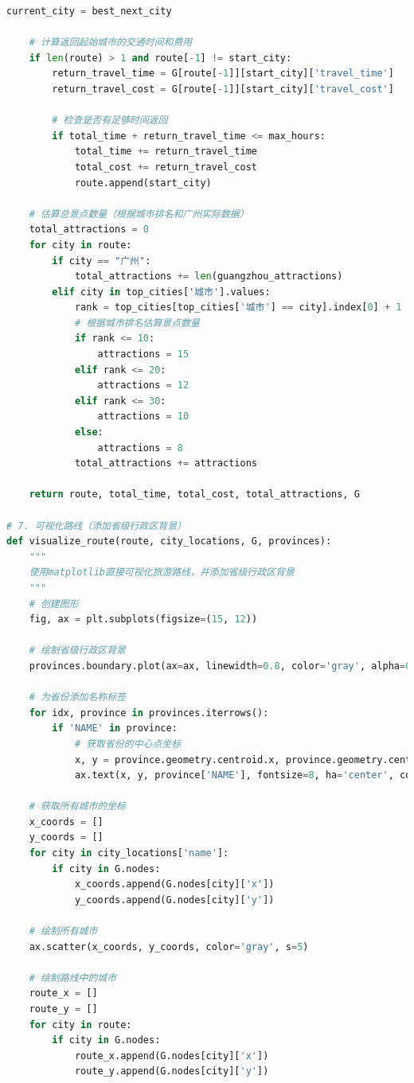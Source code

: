 \documentclass[withoutpreface,bwprint]{cumcmthesis} %
\begin{document}
\begin{appendices}
\begin{lstlisting}[language=python]
        current_city = best_next_city
    
    # 计算返回起始城市的交通时间和费用
    if len(route) > 1 and route[-1] != start_city:
        return_travel_time = G[route[-1]][start_city]['travel_time']
        return_travel_cost = G[route[-1]][start_city]['travel_cost']
        
        # 检查是否有足够时间返回
        if total_time + return_travel_time <= max_hours:
            total_time += return_travel_time
            total_cost += return_travel_cost
            route.append(start_city)
    
    # 估算总景点数量（根据城市排名和广州实际数据）
    total_attractions = 0
    for city in route:
        if city == "广州":
            total_attractions += len(guangzhou_attractions)
        elif city in top_cities['城市'].values:
            rank = top_cities[top_cities['城市'] == city].index[0] + 1
            # 根据城市排名估算景点数量 
            if rank <= 10:
                attractions = 15
            elif rank <= 20:
                attractions = 12
            elif rank <= 30:
                attractions = 10
            else:
                attractions = 8
            total_attractions += attractions
    
    return route, total_time, total_cost, total_attractions, G

# 7. 可视化路线（添加省级行政区背景）
def visualize_route(route, city_locations, G, provinces):
    """
    使用matplotlib直接可视化旅游路线，并添加省级行政区背景
    """
    # 创建图形
    fig, ax = plt.subplots(figsize=(15, 12))
    
    # 绘制省级行政区背景
    provinces.boundary.plot(ax=ax, linewidth=0.8, color='gray', alpha=0.5)
    
    # 为省份添加名称标签
    for idx, province in provinces.iterrows():
        if 'NAME' in province:
            # 获取省份的中心点坐标
            x, y = province.geometry.centroid.x, province.geometry.centroid.y
            ax.text(x, y, province['NAME'], fontsize=8, ha='center', color='gray', alpha=0.7)
    
    # 获取所有城市的坐标
    x_coords = []
    y_coords = []
    for city in city_locations['name']:
        if city in G.nodes:
            x_coords.append(G.nodes[city]['x'])
            y_coords.append(G.nodes[city]['y'])
    
    # 绘制所有城市
    ax.scatter(x_coords, y_coords, color='gray', s=5)
    
    # 绘制路线中的城市
    route_x = []
    route_y = []
    for city in route:
        if city in G.nodes:
            route_x.append(G.nodes[city]['x'])
            route_y.append(G.nodes[city]['y'])
    

\end{lstlisting}
\end{appendices}
\end{document}
